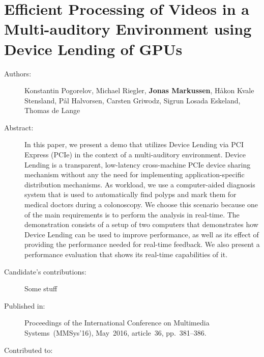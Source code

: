 \chapter{Efficient Processing of Videos in a Multi-auditory Environment using Device Lending of GPUs}
\label{paper:MMSys-2016}
\paperthumb

\begin{description}
	\item[Authors:]
	Konstantin Pogorelov, Michael Riegler, \textbf{Jonas Markussen}, H{\aa}kon Kvale Stensland,
	P{\aa}l Halvorsen, Carsten Griwodz, Sigrun Losada Eskeland, Thomas de Lange


	\item[Abstract:]
	In this paper, we present a demo that utilizes Device Lending 
	via PCI Express (PCIe) in the context of a multi-auditory
	environment. Device Lending is a transparent, low-latency
	cross-machine PCIe device sharing mechanism without any
	the need for implementing application-specific distribution
	mechanisms. As workload, we use a computer-aided diagnosis 
	system that is used to automatically find polyps and
	mark them for medical doctors during a colonoscopy. We
	choose this scenario because one of the main requirements
	is to perform the analysis in real-time. The demonstration
	consists of a setup of two computers that demonstrates how
	Device Lending can be used to improve performance, as well
	as its effect of providing the performance needed for 
	real-time feedback. We also present a performance evaluation
	that shows its real-time capabilities of it.


	\item[Candidate's contributions:]
		Some stuff

	\item[Published in:]
	Proceedings of the International Conference on Multimedia Systems~(MMSys'16),
	May~2016, article~36, pp.~381--386.

	\item[Contributed to:]

\end{description}
